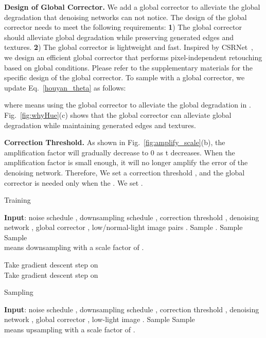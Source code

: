 \documentclass{article}
\begin{document}
\noindent \textbf{Design of Global Corrector.}
We add a global corrector to alleviate the global degradation that denoising networks can not notice. The design of the global corrector needs to meet the following requirements: \textbf{1}) The global corrector should alleviate global degradation while preserving generated edges and textures. \textbf{2}) The global corrector is lightweight and fast. Inspired by CSRNet~\cite{he2020conditional}, we design an efficient global corrector that performs pixel-independent retouching based on global conditions. Please refer to the supplementary materials for the specific design of the global corrector. To sample with a global corrector, we update Eq.~\eqref{houyan_theta} as follows: 

where  means using the global corrector to alleviate the global degradation in . Fig.~\ref{fig:whyHue}(c) shows that the global corrector can alleviate global degradation while maintaining generated edges and textures. 

\noindent \textbf{Correction Threshold.}
As shown in Fig.~\ref{fig:amplify_scale}(b), the amplification factor  will gradually decrease to 0 as t decreases. When the amplification factor is small enough, it will no longer amplify the error of the denoising network. Therefore, We set a correction threshold , and the global corrector is needed only when the . We set .

\begin{algorithm}[tb]
    \caption{Training}
    \label{alg:train}
    \begin{algorithmic}[1] \STATE \textbf{Input}: noise schedule , downsampling schedule , correction threshold , denoising network , global corrector , low/normal-light image pairs .
        \REPEAT
        \STATE  Sample .
        \STATE  Sample 
\STATE  Sample 
        \STATE  \\  means downsampling with a scale factor of .
        
\STATE Take gradient descent step on \\
        
        \IF{}
        \STATE Take gradient descent step on \\
                
        \ENDIF
    \end{algorithmic}
\end{algorithm}

\begin{algorithm}[tb]
    \caption{Sampling}
    \label{alg:test}
    \begin{algorithmic}[1] \STATE \textbf{Input}: noise schedule , downsampling schedule , correction threshold , denoising network , global corrector , low-light image .
        \STATE Sample 
\FOR{}
        \STATE 
\STATE 
\STATE Sample 
        \IF{}
\STATE 
        \\  means upsampling with a scale factor of .
        \ELSE
        
        \STATE 
        \ENDIF
        \ENDFOR
        \RETURN 
    \end{algorithmic}
\end{algorithm}
\end{document}
